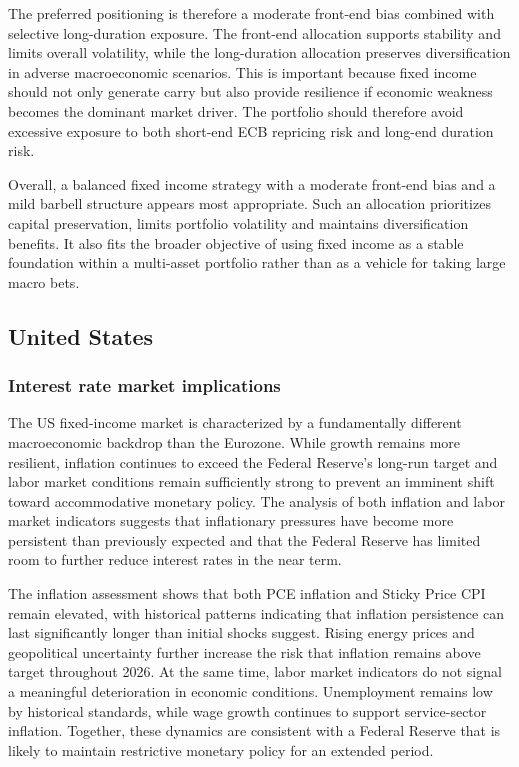 \documentclass[11pt,a4paper]{article}
\begin{document}
The preferred positioning is therefore a moderate front-end bias combined with selective long-duration exposure. The front-end allocation supports stability and limits overall volatility, while the long-duration allocation preserves diversification in adverse macroeconomic scenarios. This is important because fixed income should not only generate carry but also provide resilience if economic weakness becomes the dominant market driver. The portfolio should therefore avoid excessive exposure to both short-end ECB repricing risk and long-end duration risk.

Overall, a balanced fixed income strategy with a moderate front-end bias and a mild barbell structure appears most appropriate. Such an allocation prioritizes capital preservation, limits portfolio volatility and maintains diversification benefits. It also fits the broader objective of using fixed income as a stable foundation within a multi-asset portfolio rather than as a vehicle for taking large macro bets.

\subsection{United States}

\subsubsection{Interest rate market implications}

The US fixed-income market is characterized by a fundamentally different macroeconomic backdrop than the Eurozone. While growth remains more resilient, inflation continues to exceed the Federal Reserve's long-run target and labor market conditions remain sufficiently strong to prevent an imminent shift toward accommodative monetary policy. The analysis of both inflation and labor market indicators suggests that inflationary pressures have become more persistent than previously expected and that the Federal Reserve has limited room to further reduce interest rates in the near term.

The inflation assessment shows that both PCE inflation and Sticky Price CPI remain elevated, with historical patterns indicating that inflation persistence can last significantly longer than initial shocks suggest. Rising energy prices and geopolitical uncertainty further increase the risk that inflation remains above target throughout 2026. At the same time, labor market indicators do not signal a meaningful deterioration in economic conditions. Unemployment remains low by historical standards, while wage growth continues to support service-sector inflation. Together, these dynamics are consistent with a Federal Reserve that is likely to maintain restrictive monetary policy for an extended period.
\end{document}
